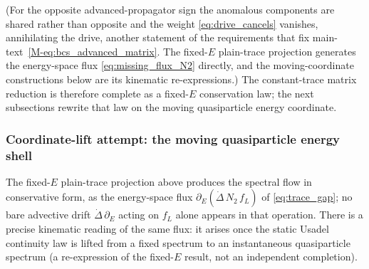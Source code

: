 \documentclass[
  aps,
  prb,
  preprint,
  superscriptaddress,
  longbibliography,
  nofootinbib
]{revtex4-2}
\newcommand{\fL}{f_L}
\begin{document}
(For the opposite advanced-propagator sign the
anomalous components are shared rather than opposite and the weight
\cref{eq:drive_cancels} vanishes, annihilating the drive, another
statement of the requirements that fix main-text~\cref{M-eq:bcs_advanced_matrix}.
The fixed-\(E\) plain-trace projection generates the energy-space flux
\cref{eq:missing_flux_N2} directly, and the moving-coordinate
constructions below are its kinematic re-expressions.)
The constant-trace matrix reduction is therefore complete as a fixed-\(E\)
conservation law; the next subsections rewrite that law on the moving
quasiparticle energy coordinate.

\subsubsection{Coordinate-lift attempt: the moving quasiparticle energy shell}
\label{sec:coordinate_lift}

The fixed-\(E\) plain-trace projection above produces the spectral flow in
conservative form, as the energy-space flux
\(\partial_E(\dot\Delta\,N_2\,\fL)\) of \cref{eq:trace_gap}; no bare
advective drift \(\dot\Delta\,\partial_E\) acting on \(\fL\) alone appears
in that operation. There is a precise kinematic reading of the same flux:
it arises once the static Usadel continuity law is lifted from a fixed
spectrum to an instantaneous quasiparticle spectrum (a re-expression of
the fixed-\(E\) result, not an independent completion).
\end{document}
